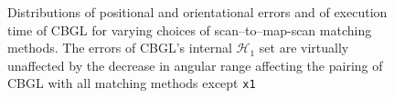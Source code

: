 \begin{figure}
  
  \vspace{0.1cm}
  \caption{\small Distributions of positional and orientational errors and of
           execution time of CBGL for varying choices of scan--to--map-scan
           matching methods. The errors of CBGL's internal $\mathcal{H}_1$ set
           are virtually unaffected by the decrease in angular range affecting
           the pairing of CBGL with all matching methods except \texttt{x1}
           }
  \label{fig:c:errors_and_time}
\end{figure}
